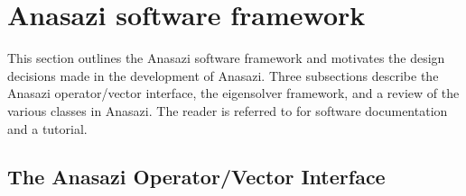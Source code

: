 \documentclass[acmtoms]{acmtrans2m}
\begin{document}



\section{Anasazi software framework}
\label{sec:framework}

This section outlines the Anasazi software framework and motivates
the design decisions made in the development of Anasazi. Three
subsections describe the Anasazi operator/vector interface, the
eigensolver framework, and a review of the various classes in
Anasazi. The reader is referred to
\cite{Trilinos:anasazi,Trilinos-Tutorial} for software documentation
and a tutorial.

\subsection{The Anasazi Operator/Vector Interface}
\label{sec:anasazi:opvec}
\end{document}
